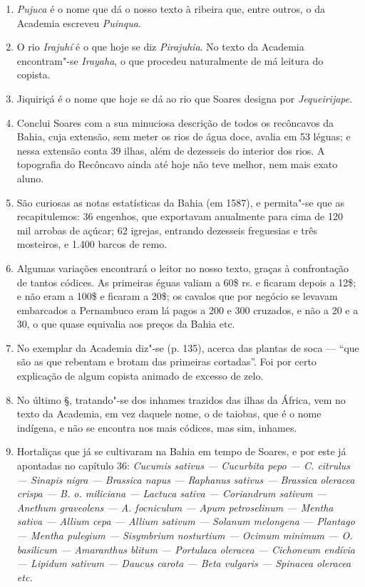\begin{enumerate}
\item \textit{Pujuca} é o nome que dá o nosso texto à ribeira que, entre outros, o da Academia 
escreveu \textit{Puinqua}.

\item O rio \textit{Irajuhí} é o que hoje se diz \textit{Pirajuhia}. No texto da Academia encontram"-se  
\textit{Irayaha}, o que procedeu naturalmente de má leitura do copista.

\item Jiquiriçá é o nome que hoje se dá ao rio que Soares designa por \textit{Jequeirijape}.

\item Conclui Soares com a sua minuciosa descrição de todos os recôncavos da Bahia, 
cuja extensão, sem meter os rios de água doce, avalia em 53 léguas; e nessa extensão 
conta 39 ilhas, além de dezesseis do interior dos rios. A topografia do Recôncavo ainda até 
hoje não teve melhor, nem mais exato aluno.

\item São curiosas as notas estatísticas da Bahia (em 1587), e permita"-se que as 
recapitulemos: 36 engenhos, que exportavam anualmente para cima de 120 mil arrobas 
de açúcar; 62 igrejas, entrando dezesseis freguesias e três mosteiros, e 1.400 barcos de remo.

\item Algumas variações encontrará o leitor no nosso texto, graças à confrontação de 
tantos códices. As primeiras éguas valiam a 60\$ rs. e ficaram depois a 12\$; e não eram 
a 100\$ e ficaram a 20\$; os cavalos que por negócio se levavam embarcados a 
Pernambuco eram lá pagos a 200 e 300 cruzados, e não a 20 e a 30, o que quase 
equivalia aos preços da Bahia etc.

\item No exemplar da Academia diz"-se (p. 135), acerca das plantas de soca --- ``que são 
as que rebentam e brotam das primeiras cortadas''. Foi por certo explicação de algum 
copista animado de excesso de zelo.

\item No último §, tratando"-se dos inhames trazidos das ilhas da África, vem no texto da 
Academia, em vez daquele nome, o de taiobas, que é o nome indígena, e não se 
encontra nos mais códices, mas sim, inhames.

\item  Hortaliças que já se cultivaram na Bahia em tempo de Soares, e
por este já apontadas no capítulo 36: \textit{Cucumis sativus --- Cucurbita pepo ---
C. citrulus --- Sinapis nigra --- Brassica napus --- Raphanus sativus --- Brassica
oleracea crispa --- B. o. miliciana --- Lactuca sativa --- Coriandrum sativum
--- Anethum graveolens --- A. focniculum --- Apum petroselinum --- Mentha sativa --- 
Allium cepa --- Allium sativum --- Solanum melongena --- Plantago
--- Mentha pulegium --- Sisymbrium nosturtium --- Ocimum minimum --- O. basilicum --- 
Amaranthus blitum --- Portulaca oleracea --- Cichoneum endívia
--- Lipidum sativum --- Daucus carota --- Beta vulgaris --- Spinacea oleracea etc.}


\end{enumerate}
